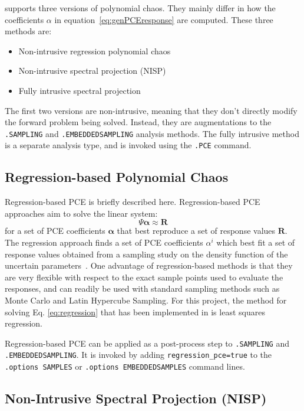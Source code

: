 \Xyce{} supports three versions of polynomial chaos.  They mainly differ in how the coefficients $\alpha$ in equation~\ref{eq:genPCEresponse} are computed.  These three methods are:
\begin{itemize}
  \item Non-intrusive regression polynomial chaos
  \item Non-intrusive spectral projection  (NISP)
  \item Fully intrusive spectral projection
\end{itemize}
The first two versions are non-intrusive, meaning that they don't directly modify the forward problem being solved.  
Instead, they are augmentations to the \texttt{.SAMPLING} and \texttt{.EMBEDDEDSAMPLING} analysis methods.
The fully intrusive method is a separate analysis type, and is invoked using the \texttt{.PCE} command.

\subsection{Regression-based Polynomial Chaos}
\label{regressionPCE}

Regression-based PCE is briefly described here.
Regression-based PCE approaches aim to solve the linear system:
\begin{equation}
\boldsymbol{\varPsi} \boldsymbol{\alpha} \approx \boldsymbol{R} \label{eq:regression}
\end{equation}
for a set of PCE coefficients $\boldsymbol{\alpha}$ that best
reproduce a set of response values $\boldsymbol{R}$.  
The regression approach finds a set of PCE coefficients $\alpha^i$ which best fit a set of response
values obtained from a sampling study on the density function of the uncertain 
parameters~\cite{pt_colloc1}.  One advantage of regression-based methods is that
they are very flexible with respect to the exact sample points used to evaluate the responses, 
and can readily be used with standard sampling methods such as Monte Carlo and Latin Hypercube Sampling.
For this project, the method for solving 
Eq. \eqref{eq:regression} that has been implemented in \Xyce{} is 
least squares regression.

Regression-based PCE can be applied as a post-process step 
to \texttt{.SAMPLING} and \texttt{.EMBEDDEDSAMPLING}.  It is invoked by adding 
\texttt{regression\_pce=true} to the \texttt{.options SAMPLES} 
or \texttt{.options EMBEDDEDSAMPLES} command lines.

\subsection{Non-Intrusive Spectral Projection (NISP)}
\label{nisp}

